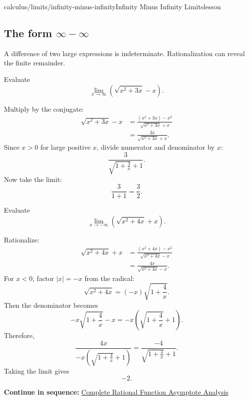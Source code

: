 \documentclass[11pt,openany]{book}
\theoremstyle{bgplain}
\newcounter{bgexample}[chapter]
\newcommand{\webnext}[2]{%
  \par\addvspace{1.2em}\noindent{\color{BGLine}\rule{\textwidth}{0.35pt}}\par\smallskip
  {\small\color{BGGray}\textbf{Continue in sequence:} \hyperlink{web:#1}{#2}}\par
}
\begin{document}
\begin{webpage}{calculus/limits/infinity-minus-infinity}{Infinity Minus Infinity Limits}{lesson}
\subsection{The form \(\infty-\infty\)}

A difference of two large expressions is indeterminate. Rationalization can reveal the finite remainder.

\begin{bgexample}[title={Rationalize at infinity}]
Evaluate
\[
  \lim_{x\to\infty}\left(\sqrt{x^2+3x}-x\right).
\]

\begin{bgsolution}
Multiply by the conjugate:
\begin{align*}
\sqrt{x^2+3x}-x
&=\frac{(x^2+3x)-x^2}{\sqrt{x^2+3x}+x}\\
&=\frac{3x}{\sqrt{x^2+3x}+x}.
\end{align*}
Since \(x>0\) for large positive \(x\), divide numerator and denominator by \(x\):
\[
  \frac3{\sqrt{1+\frac3x}+1}.
\]
Now take the limit:
\[
  \frac3{1+1}=\boxed{\frac32}.
\]
\end{bgsolution}
\end{bgexample}

\begin{bgexample}[title={Exam-level: negative infinity changes the conjugate calculation}]
Evaluate
\[
  \lim_{x\to-\infty}\left(\sqrt{x^2+4x}+x\right).
\]

\begin{bgsolution}
Rationalize:
\begin{align*}
\sqrt{x^2+4x}+x
&=\frac{(x^2+4x)-x^2}{\sqrt{x^2+4x}-x}\\
&=\frac{4x}{\sqrt{x^2+4x}-x}.
\end{align*}
For \(x<0\), factor \(|x|=-x\) from the radical:
\[
  \sqrt{x^2+4x}=(-x)\sqrt{1+\frac4x}.
\]
Then the denominator becomes
\[
  -x\sqrt{1+\frac4x}-x
  =-x\left(\sqrt{1+\frac4x}+1\right).
\]
Therefore,
\[
  \frac{4x}{-x\left(\sqrt{1+\frac4x}+1\right)}
  =\frac{-4}{\sqrt{1+\frac4x}+1}.
\]
Taking the limit gives
\[
  \boxed{-2}.
\]
\end{bgsolution}
\end{bgexample}
\webnext{calculus/limits/complete-asymptote-analysis}{Complete Rational Function Asymptote Analysis}
\end{webpage}
\end{document}
